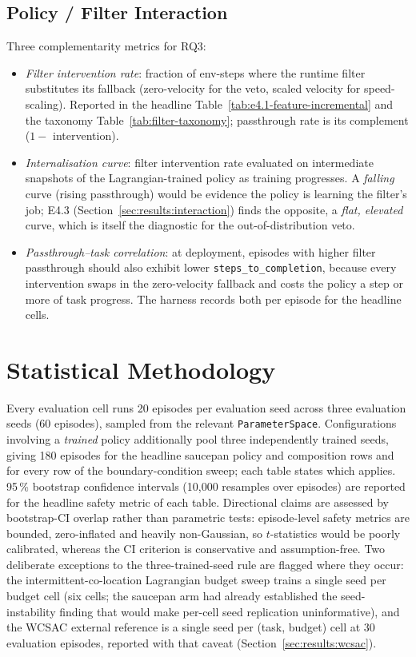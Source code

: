 \documentclass[11pt,a4paper]{report}
\begin{document}
\subsection{Policy / Filter Interaction}
\label{sec:setup:metrics:interaction}

Three complementarity metrics for RQ3:
\begin{itemize}[topsep=2pt,itemsep=1pt]
\item \emph{Filter intervention rate}: fraction of env-steps where
  the runtime filter substitutes its fallback (zero-velocity for the
  veto, scaled velocity for speed-scaling). Reported in the headline
  Table~\ref{tab:e4.1-feature-incremental} and the taxonomy
  Table~\ref{tab:filter-taxonomy}; passthrough rate is its complement
  ($1 -$ intervention).
\item \emph{Internalisation curve}: filter intervention rate
  evaluated on intermediate snapshots of the Lagrangian-trained
  policy as training progresses. A \emph{falling} curve (rising
  passthrough) would be evidence the policy is learning the filter's
  job; E4.3 (Section~\ref{sec:results:interaction}) finds the opposite,
  a \emph{flat, elevated} curve, which is itself the diagnostic for the
  out-of-distribution veto.
\item \emph{Passthrough--task correlation}: at deployment, episodes
  with higher filter passthrough should also exhibit lower
  \texttt{steps\_to\_completion}, because every intervention swaps
  in the zero-velocity fallback and costs the policy a step or
  more of task progress. The harness records both per episode for
  the headline cells.
\end{itemize}

\section{Statistical Methodology}
\label{sec:setup:stats}

Every evaluation cell runs 20 episodes per evaluation seed across
three evaluation seeds (60 episodes), sampled from the relevant
\texttt{ParameterSpace}. Configurations involving a \emph{trained}
policy additionally pool three independently trained seeds, giving
180 episodes for the headline saucepan policy and composition rows
and for every row of the boundary-condition sweep; each table states
which applies. 95\,\% bootstrap confidence intervals (10{,}000
resamples over episodes) are reported for the headline safety
metric of each table. Directional claims are assessed by
bootstrap-CI overlap rather than parametric tests: episode-level
safety metrics are bounded, zero-inflated and heavily non-Gaussian,
so $t$-statistics would be poorly calibrated, whereas the CI
criterion is conservative and assumption-free. Two deliberate
exceptions to the three-trained-seed rule are flagged where they
occur: the intermittent-co-location Lagrangian budget sweep trains a
single seed per budget cell (six cells; the saucepan arm had already
established the seed-instability finding that would make per-cell
seed replication uninformative), and the WCSAC external reference is
a single seed per (task, budget) cell at 30 evaluation episodes,
reported with that caveat (Section~\ref{sec:results:wcsac}).
\end{document}
